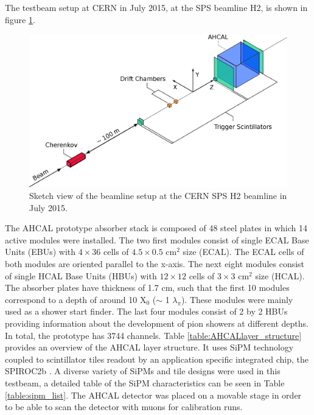 \documentclass{JINST}
\begin{document}
The testbeam setup at CERN in July 2015, at the SPS beamline H2, is shown in figure \ref{fig:TestbeamScketch}.

\begin{figure}[htbp!]
  \centering
  \includegraphics[width=0.7\linewidth]{fig/TestbeamSetup.eps}
  \caption{Sketch view of the beamline setup at the CERN SPS H2 beamline in July 2015.} \label{fig:TestbeamScketch}
\end{figure}

The AHCAL prototype absorber stack is composed of 48 steel plates in which 14 active modules were installed. The two first modules consist of single ECAL Base Units (EBUs) with $4 \times 36$ cells of $4.5 \times 0.5$ cm$^2$ size (ECAL). The ECAL cells of both modules are oriented parallel to the x-axis. The next eight modules consist of single HCAL Base Units (HBUs) with $12 \times 12$ cells of $3 \times 3$ cm$^2$ size (HCAL). The absorber plates have thickness of 1.7 cm, such that the first 10 modules correspond to a depth of around 10 X$_0$ ($\sim$ 1 $\lambda_{\pi}$). These modules were mainly used as a shower start finder. The last four modules consist of 2 by 2 HBUs providing information about the development of pion showers at different depths. In total, the prototype has 3744 channels. Table \ref{table:AHCALlayer_structure} provides an overview of the AHCAL layer structure. It uses SiPM technology coupled to scintillator tiles readout by an application specific integrated chip, the SPIROC2b \cite{5401891}. A diverse variety of SiPMs and tile designs were used in this testbeam, a detailed table of the SiPM characteristics can be seen in Table \ref{table:sipm_list}. The AHCAL detector was placed on a movable stage in order to be able to scan the detector with muons for calibration runs.
\end{document}

